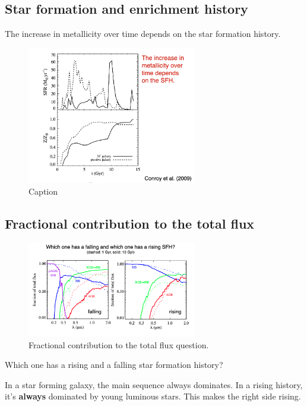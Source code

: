 \documentclass{article}
\begin{document}
\subsection{Star formation and enrichment history}

The increase in metallicity over time depends on the star formation history.

\begin{figure}
    \centering
    \includegraphics[width=0.66\textwidth]{figs/Screen Shot 2021-09-24 at 9.31.57 AM.png}
    \caption{Caption}
    \label{fig:sfr_Z}
\end{figure}

\subsection{Fractional contribution to the total flux}

\begin{figure}
    \centering
    \includegraphics[width=0.66\textwidth]{figs/Screen Shot 2021-09-24 at 9.32.16 AM.png}
    \caption{Fractional contribution to the total flux question.}
    \label{fig:frac}
\end{figure}

Which one has a rising and a falling star formation history?

In a star forming galaxy, the main sequence always dominates. In a rising history, it's \textbf{always} dominated by young luminous stars. This makes the right side rising.
\end{document}
